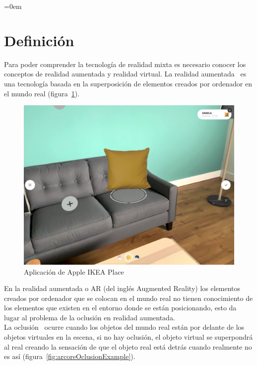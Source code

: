 \parindent=0em
\section{Definición}
\noindent


Para poder comprender la tecnología de realidad mixta es necesario conocer los conceptos de realidad aumentada y realidad virtual. La realidad aumentada~\cite{ardefinition} es una tecnología basada en la superposición de elementos creados por ordenador en el mundo real (figura~\ref{fig:ikeaAR}).

\begin{figure}[H]
    \centering
    \includegraphics[scale=0.25]{Images/Estado del arte/ikeaAR.jpg}
    \caption{Aplicación de Apple IKEA Place}
    \label{fig:ikeaAR}
\end{figure}

En la realidad aumentada o AR (del inglés Augmented Reality) los elementos creados por ordenador que se colocan en el mundo real no tienen conocimiento de los elementos que existen en el entorno donde se están posicionando, esto da lugar al problema de la oclusión en realidad aumentada. \\

La oclusión~\cite{oclussionExplanationEstadoDelArte} ocurre cuando los objetos del mundo real están por delante de los objetos virtuales en la escena, si no hay oclusión, el objeto virtual se superpondrá al real creando la sensación de que el objeto real está detrás cuando realmente no es así (figura~\ref{fig:arcoreOclusionExample}).\\

